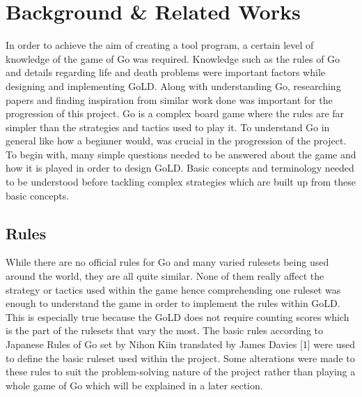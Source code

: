 \documentclass{l4proj}
\begin{document}
\chapter{Background \& Related Works}
In order to achieve the aim of creating a tool program, a certain level of knowledge of the game of Go was required. Knowledge such as the rules of Go and details regarding life and death problems were important factors while designing and implementing GoLD. Along with understanding Go, researching papers and finding inspiration from similar work done was important for the progression of this project.
Go is a complex board game where the rules are far simpler than the strategies and tactics used to play it. To understand Go in general like how a beginner would,  was crucial in the progression of the project. To begin with, many simple questions needed to be answered about the game and how it is played in order to design GoLD. Basic concepts and terminology needed to be understood before tackling complex strategies which are built up from these basic concepts.

\section{Rules}

While there are no official rules for Go and many varied rulesets being used around the world, they are all quite similar. None of them really affect the strategy or tactics used within the game hence comprehending one ruleset was enough to understand the game in order to implement the rules within GoLD. This is especially true because the GoLD does not require counting scores which is the part of the rulesets that vary the most. The basic rules according to Japanese Rules of Go set by Nihon Kiin translated by James Davies [1] were used to define the basic ruleset used within the project. Some alterations were made to these rules to suit the problem-solving nature of the project rather than playing a whole game of Go which will be explained in a later section.
\end{document}
